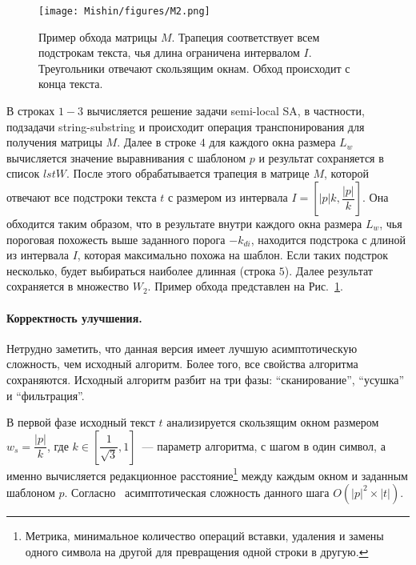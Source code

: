 \begin{figure}[t!]
\centering
    \texttt{[image: Mishin/figures/M2.png]}
    \caption{Пример обхода матрицы $M$. Трапеция соответствует всем подстрокам текста, чья длина ограничена интервалом $I$. Треугольники отвечают скользящим окнам.
    Обход происходит с конца текста.
    }\label{passage}
\end{figure}

В строках $1-3$ вычисляется решение задачи {semi-local SA}, в частности, подзадачи {string-substring} и происходит операция транспонирования для получения матрицы $M$.
Далее в строке $4$ для каждого окна размера $L_{w}$ вычисляется значение выравнивания с 
шаблоном $p$  и результат сохраняется в список $lstW$.
После этого обрабатывается трапеция в матрице $M$, которой отвечают все
подстроки текста $t$ с размером из интервала $I=[|p|k,\dfrac{|p|}{k}]$.
Она обходится таким образом, что в результате внутри каждого окна размера $L_{w}$,
чья пороговая похожесть выше заданного порога $-k_{di}$, находится подстрока с длиной из  интервала $I$, которая максимально похожа на шаблон. Если таких подстрок несколько, будет выбираться наиболее длинная (строка $5$).
Далее результат сохраняется в множество $W_{2}$.
Пример обхода представлен на Рис.~\ref{passage}.

\paragraph*{Корректность улучшения.}

Нетрудно заметить, что данная версия имеет лучшую асимптотическую сложность, чем исходный алгоритм. Более того, все свойства алгоритма сохраняются.
Исходный алгоритм разбит на три фазы: ``сканирование'', ``усушка'' и ``фильтрация''.

В первой фазе исходный текст $t$ анализируется скользящим окном размером $w_{s} = \dfrac{|p|}{k}$, где $k \in [\dfrac{1}{\sqrt{3}},1]$~--- параметр алгоритма, с шагом в один символ, а именно вычисляется редакционное расстояние\footnote{Метрика, минимальное количество операций вставки, удаления и замены одного символа на другой для превращения одной строки в другую.} между каждым окном и заданным шаблоном $p$.
Согласно~\cite{luciv2019interactive} асимптотическая сложность данного шага $O(|p|^2 \times |t|)$.

